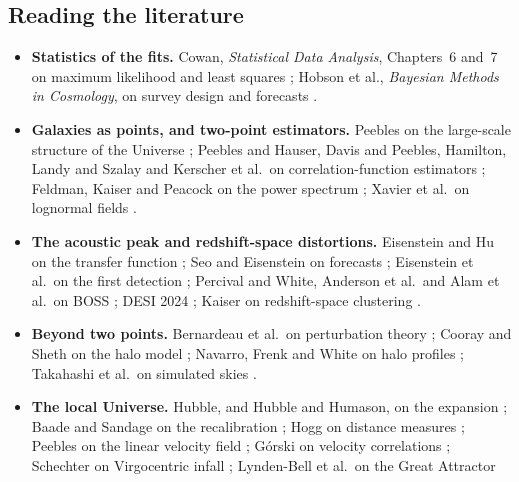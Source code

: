 \subsection*{Reading the literature}
\label{11c:sec:reading-list}

\begin{itemize}[itemsep=2pt,leftmargin=1.2em]
  \item \textbf{Statistics of the fits.} Cowan, \emph{Statistical Data Analysis},
        Chapters~6 and~7 on maximum likelihood and least squares
        ; Hobson et al., \emph{Bayesian Methods in Cosmology},
        on survey design and forecasts .
  \item \textbf{Galaxies as points, and two-point estimators.} Peebles on the
        large-scale structure of the Universe \cite{Peebles1980}; Peebles and Hauser,
        Davis and Peebles, Hamilton, Landy and Szalay and Kerscher et al.\ on
        correlation-function estimators
        \cite{PeeblesHauser1974,DavisPeebles1983,Hamilton1993,LandySzalay1993,Kerscher2000};
        Feldman, Kaiser and Peacock on the power spectrum \cite{FKP1994}; Xavier et al.\ on
        lognormal fields \cite{Xavier2016}.
  \item \textbf{The acoustic peak and redshift-space distortions.} Eisenstein and Hu on
        the transfer function \cite{EisensteinHu1998}; Seo and Eisenstein on forecasts
        \cite{SeoEisenstein2003}; Eisenstein et al.\ on the first detection
        \cite{Eisenstein2005}; Percival and White, Anderson et al.\ and Alam et al.\ on
        BOSS \cite{PercivalWhite2009,Anderson2012,Alam2017}; DESI 2024 \cite{DESI2024VI};
        Kaiser on redshift-space clustering \cite{Kaiser1987}.
  \item \textbf{Beyond two points.} Bernardeau et al.\ on perturbation theory
        \cite{Bernardeau2002}; Cooray and Sheth on the halo model \cite{CooraySheth2002};
        Navarro, Frenk and White on halo profiles \cite{NFW1997}; Takahashi et al.\ on
        simulated skies \cite{Takahashi2017sims}.
  \item \textbf{The local Universe.} Hubble, and Hubble and Humason, on the expansion
        \cite{Hubble1929,HubbleHumason1931}; Baade and Sandage on the recalibration
        \cite{Baade1956,Sandage1958}; Hogg on distance measures \cite{Hogg1999}; Peebles
        on the linear velocity field \cite{Peebles1993}; G\'orski on velocity
        correlations \cite{Gorski1988}; Schechter on Virgocentric infall
        \cite{Schechter1980}; Lynden-Bell et al.\ on the Great Attractor

\end{itemize}
